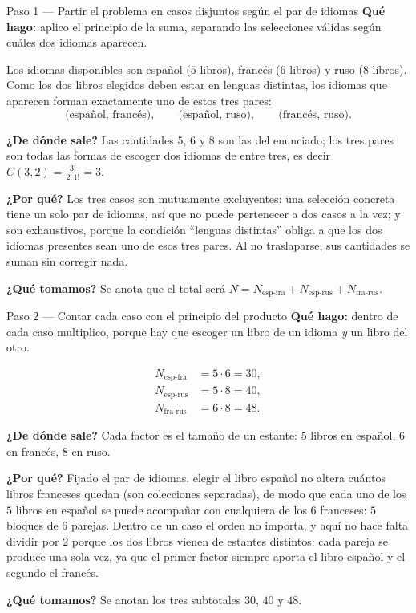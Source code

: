 \documentclass[11pt]{article}
\begin{document}
\begin{paso}{Paso 1 --- Partir el problema en casos disjuntos según el par de idiomas}
\textbf{Qué hago:} aplico el principio de la suma, separando las selecciones válidas según cuáles dos idiomas aparecen.

Los idiomas disponibles son español ($5$ libros), francés ($6$ libros) y ruso ($8$ libros). Como los dos libros elegidos deben estar en lenguas distintas, los idiomas que aparecen forman exactamente uno de estos tres pares:
\[
  \text{(español, francés)},\qquad \text{(español, ruso)},\qquad \text{(francés, ruso)}.
\]

\textbf{¿De dónde sale?} Las cantidades $5$, $6$ y $8$ son las del enunciado; los tres pares son todas las formas de escoger dos idiomas de entre tres, es decir $C(3,2)=\frac{3!}{2!\,1!}=3$.

\textbf{¿Por qué?} Los tres casos son mutuamente excluyentes: una selección concreta tiene un solo par de idiomas, así que no puede pertenecer a dos casos a la vez; y son exhaustivos, porque la condición ``lenguas distintas'' obliga a que los dos idiomas presentes sean uno de esos tres pares. Al no traslaparse, sus cantidades se suman sin corregir nada.

\textbf{¿Qué tomamos?} Se anota que el total será $N=N_{\text{esp-fra}}+N_{\text{esp-rus}}+N_{\text{fra-rus}}$.
\end{paso}

\begin{paso}{Paso 2 --- Contar cada caso con el principio del producto}
\textbf{Qué hago:} dentro de cada caso multiplico, porque hay que escoger un libro de un idioma \emph{y} un libro del otro.

\begin{align*}
  N_{\text{esp-fra}} &= 5\cdot 6 = 30,\\
  N_{\text{esp-rus}} &= 5\cdot 8 = 40,\\
  N_{\text{fra-rus}} &= 6\cdot 8 = 48.
\end{align*}

\textbf{¿De dónde sale?} Cada factor es el tamaño de un estante: $5$ libros en español, $6$ en francés, $8$ en ruso.

\textbf{¿Por qué?} Fijado el par de idiomas, elegir el libro español no altera cuántos libros franceses quedan (son colecciones separadas), de modo que cada uno de los $5$ libros en español se puede acompañar con cualquiera de los $6$ franceses: $5$ bloques de $6$ parejas. Dentro de un caso el orden no importa, y aquí no hace falta dividir por $2$ porque los dos libros vienen de estantes distintos: cada pareja se produce una sola vez, ya que el primer factor siempre aporta el libro español y el segundo el francés.

\textbf{¿Qué tomamos?} Se anotan los tres subtotales $30$, $40$ y $48$.
\end{paso}
\end{document}
